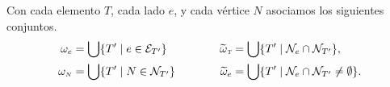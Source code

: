 Con cada elemento $T$, cada lado $e$, y cada v\'ertice $N$ asociamos los siguientes conjuntos. 
\begin{equation*}
\begin{aligned}
\omega_{e} &= \bigcup\{ T^{\prime} \mid e\in {\ensuremath{\mathcal{E}}}_{T^{\prime}} \} \\
\omega_{\text{\tiny $N$}} &= \bigcup \{ T^{\prime} \mid N\in{\ensuremath{\mathcal{N}}}_{T^{\prime}} \}
\end{aligned}
\qquad
\begin{aligned}
\widetilde{\omega}_{\textit{\tiny T}} &= \bigcup\{ T^{\prime} \mid {\ensuremath{\mathcal{N}}}_{e}\cap {\ensuremath{\mathcal{N}}}_{T^{\prime}} \}, \\
\qquad \widetilde{\omega}_{e}&= \bigcup \{ T^{\prime} \mid {\ensuremath{\mathcal{N}}}_{e}\cap {\ensuremath{\mathcal{N}}}_{T^{\prime}}\neq \emptyset \}.
\end{aligned}
\end{equation*}
